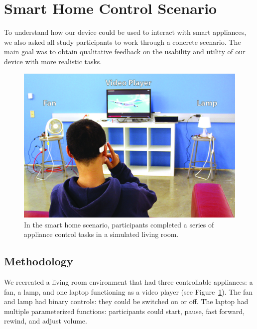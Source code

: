 \section{Smart Home Control Scenario}
To understand how our device could be used to interact with smart appliances, we also asked all study participants to work through a concrete scenario. The main goal was to obtain qualitative feedback on the usability and utility of our device with more realistic tasks.

\begin{figure}[t]
\centering
\includegraphics[width=1.0\columnwidth]{figures/smarthome-scenario.jpg}
\caption{In the smart home scenario, participants completed a series of appliance control tasks in a simulated living room.}
\label{fig:smarthome}
\end{figure}

\subsection{Methodology}
We recreated a living room environment that had three controllable appliances: a fan, a lamp, and one laptop functioning as a video player (see Figure~\ref{fig:smarthome}). The fan and lamp had binary controls: they could be switched on or off. The laptop had multiple parameterized functions: participants could start, pause, fast forward, rewind, and adjust volume.

